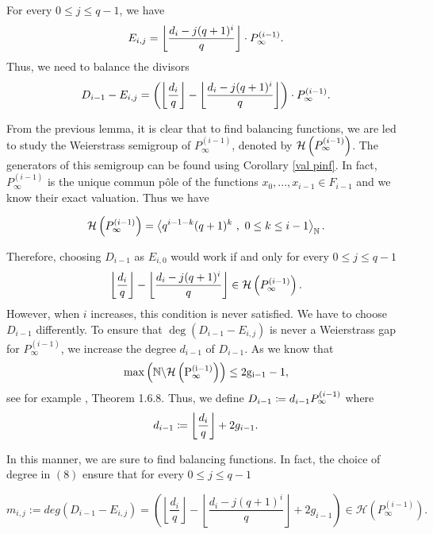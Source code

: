 \documentclass[10pt]{article}
\begin{document}
\begin{lemma} \label{divisor à équi}
For every $0 \leq j \leq q-1$, we have
\[E_{i,j} = \left\lfloor \dfrac{d_i-j(q+1)^i}{q}\right\rfloor \cdot P^{(i-1)}_{\infty}.\]
Thus, we need to balance the divisors
\[D_{i-1}-E_{i,j} = \left(\left\lfloor \dfrac{d_i}{q} \right\rfloor - \left\lfloor \dfrac{d_i-j(q+1)^i}{q}\right\rfloor\right) \cdot P^{(i-1)}_{\infty}.\]

\end{lemma}

From the previous lemma, it is clear that to find balancing functions, we are led to study the Weierstrass semigroup of $P^{(i-1)}_{\infty}$, denoted by $\mathcal{H}\left(P^{(i-1)}_{\infty}\right)$. The generators of this semigroup can be found using Corollary \ref{val pinf}. In fact, $P_{\infty}^{(i-1)}$ is the unique commun pôle of the functions $x_0,...,x_{i-1} \in 
F_{i-1}$ and we know their exact valuation. Thus we have

\[\mathcal{H}\left(P^{(i-1)}_{\infty}\right) = \left \langle q^{i-1-k}(q+1)^k \ , \ 0\leq k \leq i-1 \right\rangle_{\mathbb{N}}.\]

Therefore, choosing $D_{i-1}$ as $E_{i,0}$ would work if and only for every $0 \leq j \leq q-1$
\[ \left\lfloor \dfrac{d_i}{q} \right\rfloor - \left\lfloor \dfrac{d_i-j(q+1)^i}{q}\right\rfloor \in \mathcal{H}\left(P^{(i-1)}_{\infty}\right).\]
However, when $i$ increases, this condition is never satisfied. We have to choose $D_{i-1}$ differently.  To ensure that 
$\deg(D_{i-1}-E_{i,j})$ is never a Weierstrass gap for $P_{\infty}^{(i-1)}$, we increase the degree $d_{i-1}$ of $D_{i-1}$. As we know that
\[\rm{max}\left(\mathbb{N} \backslash \mathcal{H}\left(P^{(i-1)}_{\infty}\right)\right) \leq 2g_{i-1} -1,\]
see for example \cite{S08}, Theorem 1.6.8.
Thus, we define $D_{i-1}\coloneqq d_{i-1} P^{(i-1)}_{\infty}$ where
\begin{equation}\label{eq:deg_herm}
d_{i-1} \coloneqq \left\lfloor \dfrac{d_i}{q}\right\rfloor + 2g_{i-1}.
\end{equation}


In this manner, we are sure to find balancing functions. In fact, the choice of degree in $(8)$ ensure that for every $0 \leq j \leq q-1$ 

\begin{equation}
m_{i,j}:=deg(D_{i-1}-E_{i,j}) =  \left(\left\lfloor \dfrac{d_i}{q} \right\rfloor - \left\lfloor \dfrac{d_i-j(q+1)^i}{q}\right\rfloor + 2g_{i-1} \right) \in \mathcal{H}\left(P_{\infty}^{(i-1)}\right).
\end{equation}
\end{document}

